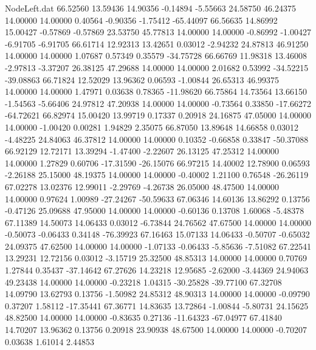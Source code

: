 \begin{filecontents}{NodeLeft.dat}
  66.52560   13.59436   14.90356    -0.14894   -5.55663   24.58750   46.24375   14.00000   14.00000    0.40564   -0.90356   -1.75412  -65.44097
  66.56635   14.86992   15.00427    -0.57869   -0.57869   23.53750   45.77813   14.00000   14.00000   -0.86992   -1.00427   -6.91705   -6.91705
  66.61714   12.92313   13.42651     0.03012   -2.94232   24.87813   46.91250   14.00000   14.00000    1.07687    0.57349    0.35579  -34.75728
  66.66769   11.98318   13.46008    -2.97813   -3.37207   26.38125   47.29688   14.00000   14.00000    2.01682    0.53992  -34.52215  -39.08863
  66.71824   12.52029   13.96362     0.06593   -1.00844   26.65313   46.99375   14.00000   14.00000    1.47971    0.03638    0.78365  -11.98620
  66.75864   14.73564   13.66150    -1.54563   -5.66406   24.97812   47.20938   14.00000   14.00000   -0.73564    0.33850  -17.66272  -64.72621
  66.82974   15.00420   13.99719     0.17337    0.20918   24.16875   47.05000   14.00000   14.00000   -1.00420    0.00281    1.94829    2.35075
  66.87050   13.89648   14.66858     0.03012   -4.48225   24.84063   46.37812   14.00000   14.00000    0.10352   -0.66858    0.33847  -50.37088
  66.92129   12.72171   13.39294    -1.47400   -2.22607   26.13125   47.25312   14.00000   14.00000    1.27829    0.60706  -17.31590  -26.15076
  66.97215   14.40002   12.78900     0.06593   -2.26188   25.15000   48.19375   14.00000   14.00000   -0.40002    1.21100    0.76548  -26.26119
  67.02278   13.02376   12.99011    -2.29769   -4.26738   26.05000   48.47500   14.00000   14.00000    0.97624    1.00989  -27.24267  -50.59633
  67.06346   14.60136   13.86292     0.13756   -0.47126   25.09688   47.95000   14.00000   14.00000   -0.60136    0.13708    1.60068   -5.48378
  67.11389   14.50073   14.06433     0.03012   -6.73844   24.76562   47.67500   14.00000   14.00000   -0.50073   -0.06433    0.34148  -76.39923
  67.16463   15.07133   14.06433    -0.50707   -0.65032   24.09375   47.62500   14.00000   14.00000   -1.07133   -0.06433   -5.85636   -7.51082
  67.22541   13.29231   12.72156     0.03012   -3.15719   25.32500   48.85313   14.00000   14.00000    0.70769    1.27844    0.35437  -37.14642
  67.27626   14.23218   12.95685    -2.62000   -3.44369   24.94063   49.23438   14.00000   14.00000   -0.23218    1.04315  -30.25828  -39.77100
  67.32708   14.09790   13.62793     0.13756   -1.50982   24.85312   48.90313   14.00000   14.00000   -0.09790    0.37207    1.58112  -17.35441
  67.36771   14.83635   13.72864    -1.00844   -5.80731   24.15625   48.82500   14.00000   14.00000   -0.83635    0.27136  -11.64323  -67.04977
  67.41840   14.70207   13.96362     0.13756    0.20918   23.90938   48.67500   14.00000   14.00000   -0.70207    0.03638    1.61014    2.44853

\end{filecontents}
